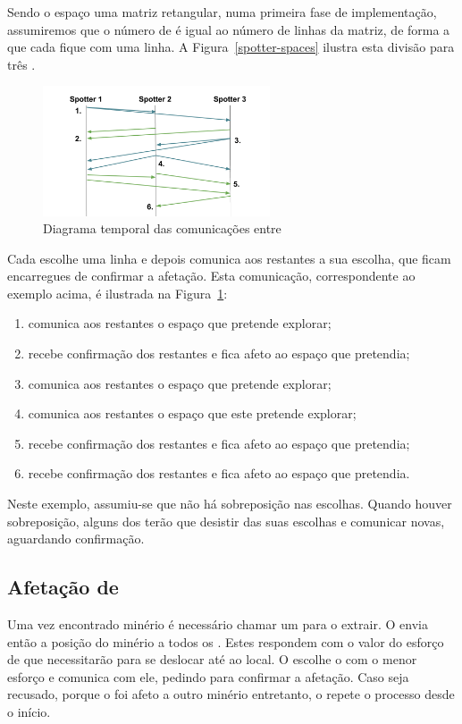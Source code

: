 \documentclass[12pt]{report}
\begin{document}
Sendo o espaço uma matriz retangular, numa primeira fase de implementação, assumiremos que o número de \spotters é igual ao número de linhas da matriz, de forma a que cada \spotter fique com uma linha. A Figura~\ref{spotter-spaces} ilustra esta divisão para três \spotters.

\begin{figure}[h]
	\centering
    \includegraphics[width=0.6\textwidth]{spotter-agreement}
	\caption{Diagrama temporal das comunicações entre \spotters}
	\label{spotter-agreement}
\end{figure}  

Cada \spotter escolhe uma linha e depois comunica aos restantes a sua escolha, que ficam encarregues de confirmar a afetação. Esta comunicação, correspondente ao exemplo acima, é ilustrada na Figura~\ref{spotter-agreement}:
\begin{enumerate}
	\item {} comunica aos restantes o espaço que pretende explorar;
    \item {} recebe confirmação dos restantes e fica afeto ao espaço que pretendia;
    \item {} comunica aos restantes o espaço que pretende explorar;
    \item {} comunica aos restantes o espaço que este pretende explorar;
    \item {} recebe confirmação dos restantes e fica afeto ao espaço que pretendia;
    \item {} recebe confirmação dos restantes e fica afeto ao espaço que pretendia.
\end{enumerate}

Neste exemplo, assumiu-se que não há sobreposição nas escolhas. Quando houver sobreposição, alguns dos \spotters terão que desistir das suas escolhas e comunicar novas, aguardando confirmação.

\FloatBarrier
\subsection{Afetação de \producers}
Uma vez encontrado minério é necessário chamar um \producer para o extrair. O \spotter envia então a posição do  minério a todos os \producers. 
Estes respondem com o valor do esforço de que necessitarão para se deslocar até ao local. 
O \spotter escolhe o \producer com o menor esforço e comunica com ele, pedindo para confirmar a afetação. 
Caso seja recusado, porque o \producer foi afeto a outro minério entretanto, o \spotter repete o processo desde o início.
\end{document}
